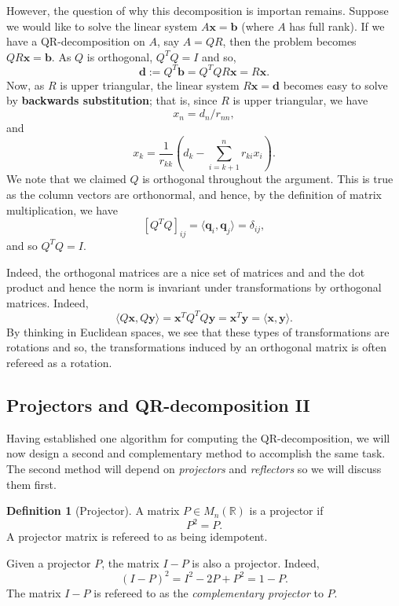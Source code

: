 \documentclass[
]{article}
\theoremstyle{definition}
\theoremstyle{definition}
\newtheorem{definition}{Definition}[section]
\begin{document}
However, the question of why this decomposition is importan remains.
Suppose we would like to solve the linear system
\(A\mathbf{x} = \mathbf{b}\) (where \(A\) has full rank). If we have a
QR-decomposition on \(A\), say \(A = QR\), then the problem becomes
\(QR\mathbf{x} = \mathbf{b}\). As \(Q\) is orthogonal, \(Q^T Q = I\) and
so, \[\mathbf{d} := Q^T\mathbf{b} = Q^TQ R\mathbf{x} = R\mathbf{x}.\]
Now, as \(R\) is upper triangular, the linear system
\(R\mathbf{x} = \mathbf{d}\) becomes easy to solve by \textbf{backwards
substitution}; that is, since \(R\) is upper triangular, we have
\[x_n = d_n / r_{nn},\] and
\[x_k = \frac{1}{r_{kk}} \left(d_k - \sum_{i = k + 1}^n r_{ki}x_i\right).\]
We note that we claimed \(Q\) is orthogonal throughout the argument.
This is true as the column vectors are orthonormal, and hence, by the
definition of matrix multiplication, we have
\[[Q^T Q]_{ij} = \langle \mathbf{q}_i, \mathbf{q}_j \rangle = \delta_{ij},\]
and so \(Q^T Q = I\).

Indeed, the orthogonal matrices are a nice set of matrices and and the
dot product and hence the norm is invariant under transformations by
orthogonal matrices. Indeed,
\[\langle Q\mathbf{x}, Q\mathbf{y} \rangle = \mathbf{x}^T Q^T Q \mathbf{y} = 
  \mathbf{x}^T \mathbf{y} = \langle \mathbf{x}, \mathbf{y} \rangle.\] By
thinking in Euclidean spaces, we see that these types of transformations
are rotations and so, the transformations induced by an orthogonal
matrix is often refereed as a rotation.

\hypertarget{projectors-and-qr-decomposition-ii}{%
\subsection{Projectors and QR-decomposition
II}\label{projectors-and-qr-decomposition-ii}}

Having established one algorithm for computing the QR-decomposition, we
will now design a second and complementary method to accomplish the same
task. The second method will depend on \emph{projectors} and
\emph{reflectors} so we will discuss them first.

\begin{definition}[Projector]
  A matrix \(P \in M_n(\mathbb{R})\) is a projector if 
  \[P^2 = P.\]
  A projector matrix is refereed to as being idempotent.
\end{definition}

Given a projector \(P\), the matrix \(I - P\) is also a projector.
Indeed, \[(I - P)^2 = I^2 - 2P + P^2 = 1 - P.\] The matrix \(I - P\) is
refereed to as the \emph{complementary projector} to \(P\).
\end{document}
